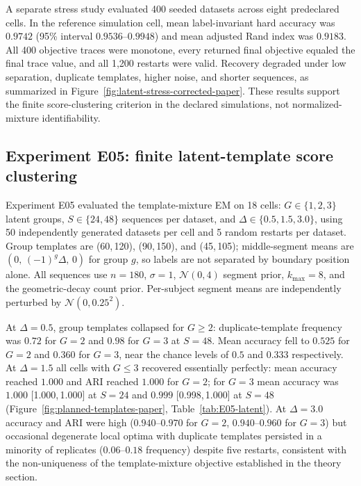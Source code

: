 

A separate stress study evaluated 400 seeded datasets across eight predeclared cells. In the reference simulation cell, mean label-invariant hard accuracy was $0.9742$ (95\% interval $0.9536$--$0.9948$) and mean adjusted Rand index was $0.9183$. All 400 objective traces were monotone, every returned final objective equaled the final trace value, and all 1,200 restarts were valid. Recovery degraded under low separation, duplicate templates, higher noise, and shorter sequences, as summarized in Figure~\ref{fig:latent-stress-corrected-paper}. These results support the finite score-clustering criterion in the declared simulations, not normalized-mixture identifiability.



\FloatBarrier
\subsection{Experiment E05: finite latent-template score clustering}
Experiment E05 evaluated the template-mixture EM on 18 cells: $G\in\{1,2,3\}$ latent groups, $S\in\{24,48\}$ sequences per dataset, and $\Delta\in\{0.5,1.5,3.0\}$, using 50 independently generated datasets per cell and 5 random restarts per dataset. Group templates are (60,\,120), (90,\,150), and (45,\,105); middle-segment means are $(0,\,(-1)^g\Delta,\,0)$ for group $g$, so labels are not separated by boundary position alone. All sequences use $n=180$, $\sigma=1$, $\mathcal{N}(0,4)$ segment prior, $k_{\max}=8$, and the geometric-decay count prior. Per-subject segment means are independently perturbed by $\mathcal{N}(0,0.25^2)$.

At $\Delta=0.5$, group templates collapsed for $G\geq2$: duplicate-template frequency was $0.72$ for $G=2$ and $0.98$ for $G=3$ at $S=48$. Mean accuracy fell to $0.525$ for $G=2$ and $0.360$ for $G=3$, near the chance levels of $0.5$ and $0.333$ respectively. At $\Delta=1.5$ all cells with $G\leq3$ recovered essentially perfectly: mean accuracy reached $1.000$ and ARI reached $1.000$ for $G=2$; for $G=3$ mean accuracy was $1.000$ [1.000,\,1.000] at $S=24$ and $0.999$ [0.998,\,1.000] at $S=48$ (Figure~\ref{fig:planned-templates-paper}, Table~\ref{tab:E05-latent}). At $\Delta=3.0$ accuracy and ARI were high ($0.940$--$0.970$ for $G=2$, $0.940$--$0.960$ for $G=3$) but occasional degenerate local optima with duplicate templates persisted in a minority of replicates ($0.06$--$0.18$ frequency) despite five restarts, consistent with the non-uniqueness of the template-mixture objective established in the theory section.

